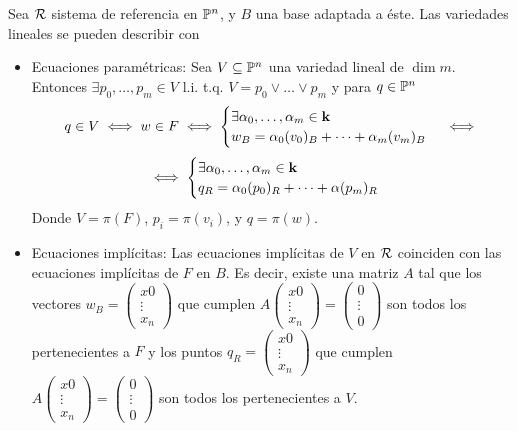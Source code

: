 \begin{obs}
    Sea $\mathcal{R}$ sistema de referencia en $\mathbb{P}^n$, y $B$ una base adaptada a éste. Las variedades lineales se pueden describir con
    \begin{itemize}
        \item Ecuaciones paramétricas: Sea $V \subseteq \mathbb{P}^n$ una variedad lineal de $\dim m$. Entonces
        $\exists p_0, \dots, p_m \in V$ l.i. t.q. $V = p_0 \vee \dots \vee p_m$ y para $q \in \mathbb{P}^n$
        \[
            q \in V \iff w \in F \iff 
            \begin{cases} 
                \exists \alpha_0, \dots, \alpha_m \in \mathbf{k} \\ 
                w_B = \alpha_0(v_0)_B + \dots + \alpha_m(v_m)_B 
            \end{cases} 
            \iff
            \]
        \[
            \iff 
            \begin{cases}
                \exists \alpha_0, \dots, \alpha_m \in \mathbf{k} \\ 
                q_R = \alpha_0 (p_0)_R + \dots + \alpha (p_m)_R 
            \end{cases}
        \]
        Donde $V = \pi(F)$, $p_i = \pi(v_i)$, y $q = \pi(w)$.
        \item Ecuaciones implícitas: Las ecuaciones implícitas de $V$ en $\mathcal{R}$ coinciden con las ecuaciones implícitas de $F$ en
        $B$. Es decir, existe una matriz $A$ tal que los vectores $w_B = \begin{pmatrix} x0 \\ \vdots \\ x_n \end{pmatrix}$ que cumplen $A \begin{pmatrix} x0 \\ \vdots \\ x_n \end{pmatrix} = 
        \begin{pmatrix} 0 \\ \vdots \\ 0 \end{pmatrix}$ son todos los pertenecientes a $F$ y los puntos 
        $q_R = \begin{pmatrix} x0 \\ \vdots \\ x_n \end{pmatrix}$ que cumplen $A \begin{pmatrix} x0 \\ \vdots \\ x_n \end{pmatrix} = 
        \begin{pmatrix} 0 \\ \vdots \\ 0 \end{pmatrix}$ son todos los pertenecientes a $V$.
    \end{itemize}
\end{obs}
